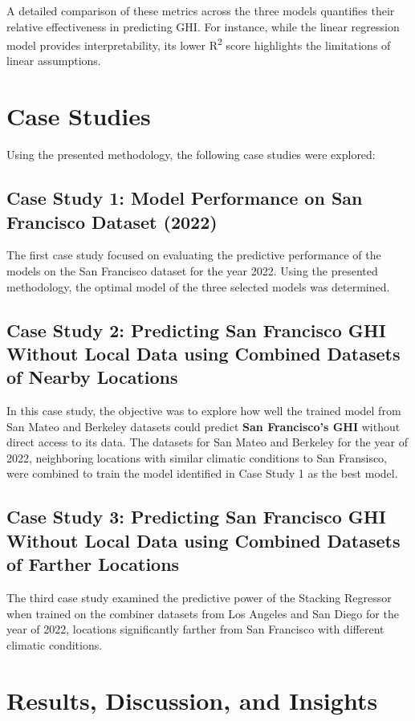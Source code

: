 \documentclass[10pt,twocolumn]{article}
\begin{document}
A detailed comparison of these metrics across the three models quantifies their relative effectiveness in predicting GHI. For instance, while the linear regression model provides interpretability, its lower R\textsuperscript{2} score highlights the limitations of linear assumptions.
\section{Case Studies}

Using the presented methodology, the following case studies were explored:

\subsection{Case Study 1: Model Performance on San Francisco Dataset (2022)}
The first case study focused on evaluating the predictive performance of the models on the {San Francisco dataset for the year 2022}. Using the presented methodology, the optimal model of the three selected models was determined. 

\subsection{Case Study 2: Predicting San Francisco GHI Without Local Data using Combined Datasets of Nearby Locations}

In this case study, the objective was to explore how well the trained model from {San Mateo and Berkeley datasets} could predict \textbf{San Francisco's GHI} without direct access to its data. The datasets for San Mateo and Berkeley for the year of 2022, neighboring locations with similar climatic conditions to San Fransisco, were combined to train the model identified in Case Study 1 as the best model. 


\subsection{Case Study 3: Predicting San Francisco GHI Without Local Data using Combined Datasets of Farther Locations}

The third case study examined the predictive power of the Stacking Regressor when trained on the combiner datasets from Los Angeles and San Diego for the year of 2022, locations significantly farther from San Francisco with different climatic conditions.




\section{Results, Discussion, and Insights}
\end{document}
